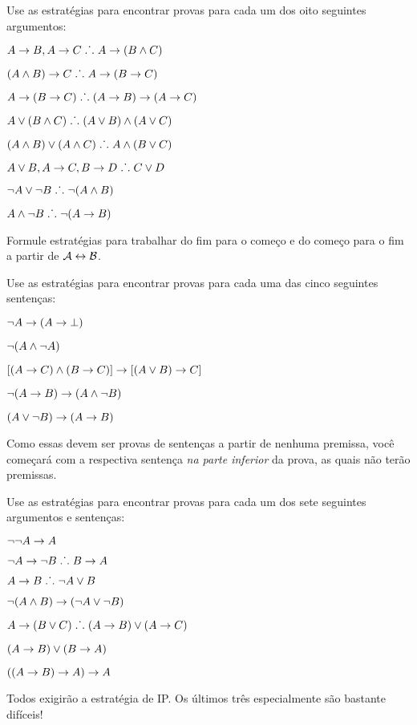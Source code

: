 
\practiceproblems

\problempart
Use as estrat\'egias  para encontrar provas para cada um dos oito seguintes argumentos:
\begin{earg}
\item $A \rightarrow B, A \rightarrow C \mathrel{\ldotp\dot{}\,\ldotp} A \rightarrow (B \wedge C)$
\item $(A \wedge B) \rightarrow C \mathrel{\ldotp\dot{}\,\ldotp} A \rightarrow (B \rightarrow C)$
\item $A \rightarrow (B \rightarrow C) \mathrel{\ldotp\dot{}\,\ldotp} (A \rightarrow B) \rightarrow (A \rightarrow C)$
\item $A \vee (B \wedge C) \mathrel{\ldotp\dot{}\,\ldotp} (A \vee B) \wedge (A \vee C)$
\item $(A \wedge B) \vee (A \wedge C) \mathrel{\ldotp\dot{}\,\ldotp} A \wedge (B \vee C)$
\item $A \vee B, A \rightarrow C, B \rightarrow D \mathrel{\ldotp\dot{}\,\ldotp} C \vee D$
\item $\neg A \lor \neg B \mathrel{\ldotp\dot{}\,\ldotp} \neg(A \wedge B)$
\item $A \wedge \neg B \mathrel{\ldotp\dot{}\,\ldotp} \neg(A \rightarrow B)$
\end{earg}

\problempart
Formule estrat\'egias para trabalhar do fim para o come\c co e do come\c co para o fim a partir de $\mathcal{A} \leftrightarrow \mathcal{B}$.

\problempart
Use as estrat\'egias para encontrar provas para cada uma das cinco seguintes senten\c cas:
\begin{earg}
\item $\neg A \rightarrow (A \rightarrow \bot)$
\item $\neg(A \wedge \neg A)$
\item $[(A \rightarrow C) \wedge (B \rightarrow C)] \rightarrow [(A \lor B) \rightarrow C]$
\item $\neg(A \rightarrow B) \rightarrow (A \wedge \neg B)$
\item $(A \vee \neg B) \rightarrow (A \rightarrow B)$
\end{earg}


Como essas devem ser provas de senten\c cas a partir de nenhuma premissa, voc\^e come\c car\'a com a respectiva senten\c ca \emph{na parte inferior} da prova, as quais n\~ao ter\~ao premissas.

\problempart
Use as estrat\'egias para encontrar provas para cada um dos sete seguintes argumentos e senten\c cas:
\begin{earg}
\item $\neg\neg A \rightarrow A$
\item $\neg A \rightarrow \neg B \mathrel{\ldotp\dot{}\,\ldotp} B \rightarrow A$
\item $A \rightarrow B \mathrel{\ldotp\dot{}\,\ldotp} \neg A \vee B$
\item $\neg(A \wedge B) \rightarrow (\neg A \vee \neg B)$
\item $A \rightarrow (B \vee C) \mathrel{\ldotp\dot{}\,\ldotp} (A \rightarrow B) \vee (A \rightarrow C)$
\item $(A \rightarrow B) \lor (B \rightarrow A)$
\item $((A \rightarrow B) \rightarrow A) \rightarrow A$
\end{earg}
Todos exigir\~ao a estrat\'egia de IP. Os \'ultimos tr\^es especialmente s\~ao bastante dif\'iceis!

